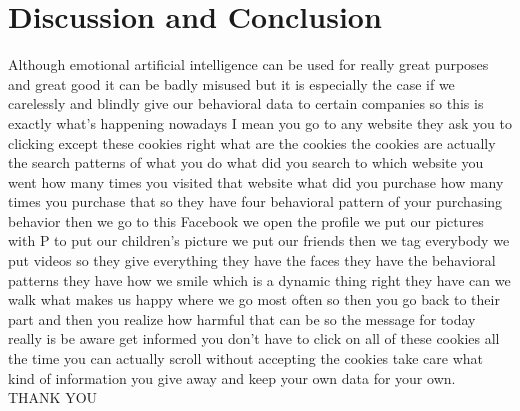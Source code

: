 \documentclass[12pt]{article}
\begin{document}
\section{Discussion and Conclusion}
Although emotional artificial intelligence can be used for really great purposes and great good it can be badly misused but it is especially the case if we carelessly and blindly give our behavioral data to certain companies so this is exactly what's happening nowadays I mean you go to any website they ask you to clicking except these cookies right what are the cookies the cookies are actually the search patterns of what you do what did you search to which website you went how many times you visited that website what did you purchase how many times you purchase that so they have four behavioral pattern of your purchasing behavior then we go to this Facebook we open the profile we put our pictures with P to put our children's picture we put our friends then we tag everybody we put videos so they give everything they  have the faces they have the behavioral patterns they have how we smile which is a dynamic thing right they have can we walk what makes us happy where we go most often so then you go back to their part and then you realize how harmful that can be so the message for today really is be aware get informed you don't have to click on all of these cookies all the time you can actually scroll without accepting the cookies take care what kind of information you give away and keep your own data for your own. THANK YOU
\end{document}

